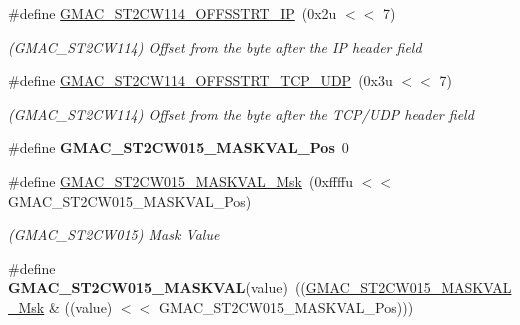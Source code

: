 \begin{DoxyCompactItemize}
\mbox{\label{group__SAMV71__GMAC_gad540cdb4585551b8be51a9668bb5f842}} 
\#define \mbox{\hyperlink{group__SAMV71__GMAC_gad540cdb4585551b8be51a9668bb5f842}{G\+M\+A\+C\+\_\+\+S\+T2\+C\+W114\+\_\+\+O\+F\+F\+S\+S\+T\+R\+T\+\_\+\+IP}}~(0x2u $<$$<$ 7)
\begin{DoxyCompactList}\small\item\em (G\+M\+A\+C\+\_\+\+S\+T2\+C\+W114) Offset from the byte after the IP header field \end{DoxyCompactList}\item 
\mbox{\label{group__SAMV71__GMAC_gab95eee5e576df2b6245e3ee82497cd81}} 
\#define \mbox{\hyperlink{group__SAMV71__GMAC_gab95eee5e576df2b6245e3ee82497cd81}{G\+M\+A\+C\+\_\+\+S\+T2\+C\+W114\+\_\+\+O\+F\+F\+S\+S\+T\+R\+T\+\_\+\+T\+C\+P\+\_\+\+U\+DP}}~(0x3u $<$$<$ 7)
\begin{DoxyCompactList}\small\item\em (G\+M\+A\+C\+\_\+\+S\+T2\+C\+W114) Offset from the byte after the T\+C\+P/\+U\+DP header field \end{DoxyCompactList}\item 
\mbox{\label{group__SAMV71__GMAC_ga4c7d1c7dd47556ff170eb753648b3001}} 
\#define {\bfseries G\+M\+A\+C\+\_\+\+S\+T2\+C\+W015\+\_\+\+M\+A\+S\+K\+V\+A\+L\+\_\+\+Pos}~0
\item 
\mbox{\label{group__SAMV71__GMAC_ga3859605b762f911e585c5ca2de5ccd8a}} 
\#define \mbox{\hyperlink{group__SAMV71__GMAC_ga3859605b762f911e585c5ca2de5ccd8a}{G\+M\+A\+C\+\_\+\+S\+T2\+C\+W015\+\_\+\+M\+A\+S\+K\+V\+A\+L\+\_\+\+Msk}}~(0xffffu $<$$<$ G\+M\+A\+C\+\_\+\+S\+T2\+C\+W015\+\_\+\+M\+A\+S\+K\+V\+A\+L\+\_\+\+Pos)
\begin{DoxyCompactList}\small\item\em (G\+M\+A\+C\+\_\+\+S\+T2\+C\+W015) Mask Value \end{DoxyCompactList}\item 
\mbox{\label{group__SAMV71__GMAC_gaae8bae1013be67c662d5996bb0897e97}} 
\#define {\bfseries G\+M\+A\+C\+\_\+\+S\+T2\+C\+W015\+\_\+\+M\+A\+S\+K\+V\+AL}(value)~((\mbox{\hyperlink{group__SAMV71__GMAC_ga3859605b762f911e585c5ca2de5ccd8a}{G\+M\+A\+C\+\_\+\+S\+T2\+C\+W015\+\_\+\+M\+A\+S\+K\+V\+A\+L\+\_\+\+Msk}} \& ((value) $<$$<$ G\+M\+A\+C\+\_\+\+S\+T2\+C\+W015\+\_\+\+M\+A\+S\+K\+V\+A\+L\+\_\+\+Pos)))

\end{DoxyCompactItemize}
